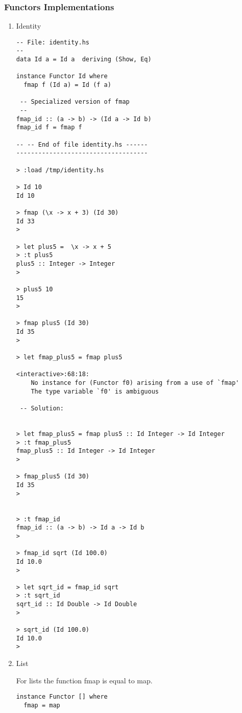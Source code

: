 \documentclass[11pt]{article}
\begin{document}
\subsubsection{Functors Implementations}
\label{sec-1-12-3}
\begin{enumerate}
\item Identity
\label{sec-1-12-3-1}

\begin{verbatim}
-- File: identity.hs 
--
data Id a = Id a  deriving (Show, Eq)

instance Functor Id where
  fmap f (Id a) = Id (f a)

 -- Specialized version of fmap 
 --
fmap_id :: (a -> b) -> (Id a -> Id b)
fmap_id f = fmap f 

-- -- End of file identity.hs ------
------------------------------------

> :load /tmp/identity.hs

> Id 10
Id 10

> fmap (\x -> x + 3) (Id 30)
Id 33
> 

> let plus5 =  \x -> x + 5
> :t plus5
plus5 :: Integer -> Integer
> 

> plus5 10
15
> 

> fmap plus5 (Id 30)
Id 35
> 

> let fmap_plus5 = fmap plus5

<interactive>:68:18:
    No instance for (Functor f0) arising from a use of `fmap'
    The type variable `f0' is ambiguous
 
 -- Solution:
 
 
> let fmap_plus5 = fmap plus5 :: Id Integer -> Id Integer 
> :t fmap_plus5
fmap_plus5 :: Id Integer -> Id Integer
> 

> fmap_plus5 (Id 30)
Id 35
> 


> :t fmap_id
fmap_id :: (a -> b) -> Id a -> Id b
> 

> fmap_id sqrt (Id 100.0)
Id 10.0
> 
 
> let sqrt_id = fmap_id sqrt
> :t sqrt_id
sqrt_id :: Id Double -> Id Double
> 

> sqrt_id (Id 100.0)
Id 10.0
>
\end{verbatim}

\item List
\label{sec-1-12-3-2}

For lists the function fmap is equal to map. 

\begin{verbatim}
instance Functor [] where
  fmap = map


\end{verbatim}
\end{enumerate}
\end{document}
